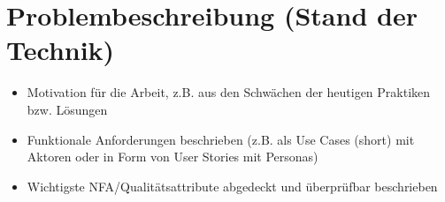 \section{Problembeschreibung (Stand der Technik)}

\begin{itemize}	
	\item Motivation für die Arbeit, z.B. aus den Schwächen der heutigen Praktiken bzw. Lösungen
	\item Funktionale Anforderungen beschrieben (z.B. als Use Cases (short) mit Aktoren oder in Form von User Stories mit Personas)
	\item Wichtigste NFA/Qualitätsattribute abgedeckt und überprüfbar beschrieben
\end{itemize}